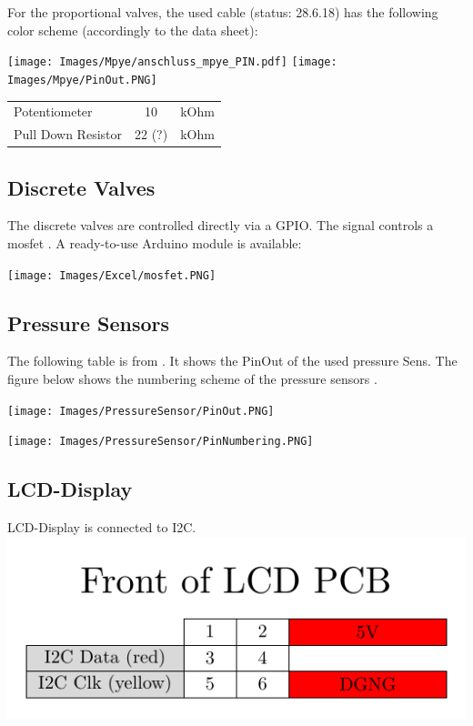 \documentclass[
	fontsize=10pt
	paper=a4
]{scrartcl}
\begin{document}
For the proportional valves, the used cable (status: 28.6.18) has the following color scheme (accordingly to the data sheet\cite[p. 9]{MPYE_DATASHEET}):


\texttt{[image: Images/Mpye/anschluss\_mpye\_PIN.pdf]}
\texttt{[image: Images/Mpye/PinOut.PNG]}

\begin{tabular}{lcr}
Potentiometer & 10 & kOhm \\
Pull Down Resistor & 22 (?) & kOhm \\
\end{tabular}


\subsection{Discrete Valves}	
The discrete valves are controlled directly via a GPIO.
The signal controls a mosfet \cite{IRF540_DATASHEET}.
A ready-to-use Arduino module is available:

\texttt{[image: Images/Excel/mosfet.PNG]}



\subsection{Pressure Sensors}

The following table is from \cite[p. 30]{SSC_DATASHEET}. 
It shows the PinOut of the used pressure Sens.
The figure below shows the numbering scheme of the pressure sensors \cite[p. 19]{SSC_DATASHEET}.

\texttt{[image: Images/PressureSensor/PinOut.PNG]}

\texttt{[image: Images/PressureSensor/PinNumbering.PNG]}



\subsection{LCD-Display}

LCD-Display is connected to I2C.
\includegraphics[scale=1]{Images/LCDDisplay/LCDPins.pdf}
\end{document}
